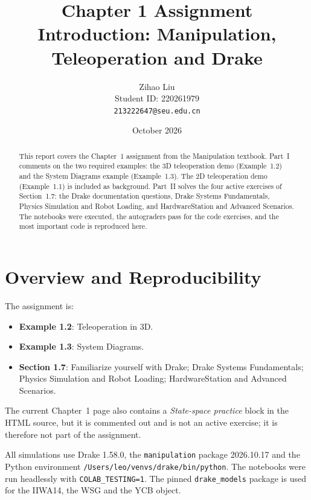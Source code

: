 \documentclass[11pt]{article}
\title{\textbf{Chapter 1 Assignment}\\[4pt]
Introduction: Manipulation, Teleoperation and Drake}
\author{Zihao Liu\\[2pt]
Student ID: 220261979\\[2pt]
\texttt{213222647@seu.edu.cn}}
\date{October 2026}
\begin{document}
\maketitle

\begin{abstract}
This report covers the Chapter~1 assignment from the Manipulation textbook.
Part~I comments on the two required examples: the 3D teleoperation demo
(Example~1.2) and the System Diagrams example (Example~1.3).  The 2D
teleoperation demo (Example~1.1) is included as background.  Part~II solves the
four active exercises of Section~1.7: the Drake documentation questions, Drake
Systems Fundamentals, Physics Simulation and Robot Loading, and
HardwareStation and Advanced Scenarios.  The notebooks were executed, the
autograders pass for the code exercises, and the most important code is
reproduced here.
\end{abstract}

\tableofcontents
\newpage

\section{Overview and Reproducibility}

The assignment is:
\begin{itemize}[leftmargin=1.4em]
  \item \textbf{Example 1.2}: Teleoperation in 3D.
  \item \textbf{Example 1.3}: System Diagrams.
  \item \textbf{Section 1.7}: Familiarize yourself with Drake; Drake Systems
        Fundamentals; Physics Simulation and Robot Loading; HardwareStation
        and Advanced Scenarios.
\end{itemize}

The current Chapter~1 page also contains a \emph{State-space practice} block in
the HTML source, but it is commented out and is not an active exercise; it is
therefore not part of the assignment.

All simulations use Drake 1.58.0, the \texttt{manipulation} package 2026.10.17
and the Python environment \texttt{/Users/leo/venvs/drake/bin/python}.  The
notebooks were run headlessly with \texttt{COLAB\_TESTING=1}.  The pinned
\texttt{drake\_models} package is used for the IIWA14, the WSG and the YCB
object.
\end{document}
